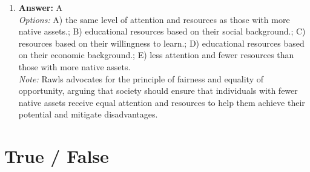 \documentclass[12pt]{article}
\begin{document}
\begin{enumerate}[label=\arabic*.]
\item \textbf{Answer:} A
\\ \textit{Options:} A) the same level of attention and resources as those with more native assets.; B) educational resources based on their social background.; C) resources based on their willingness to learn.; D) educational resources based on their economic background.; E) less attention and fewer resources than those with more native assets.
\\ \textit{Note:} Rawls advocates for the principle of fairness and equality of opportunity, arguing that society should ensure that individuals with fewer native assets receive equal attention and resources to help them achieve their potential and mitigate disadvantages.
\end{enumerate}

\section*{True / False}
\end{document}
